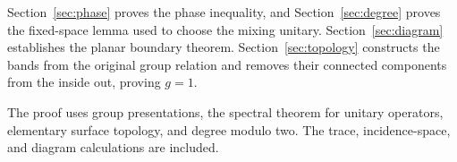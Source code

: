 Section~\ref{sec:phase} proves the phase inequality, and
Section~\ref{sec:degree} proves the fixed-space lemma used to choose the
mixing unitary. Section~\ref{sec:diagram} establishes the planar boundary
theorem. Section~\ref{sec:topology} constructs the bands from the original
group relation and removes their connected components from the inside
out, proving $g=1$.

The proof uses group presentations, the spectral theorem for unitary
operators, elementary surface topology, and degree modulo two. The trace,
incidence-space, and diagram calculations are included.
